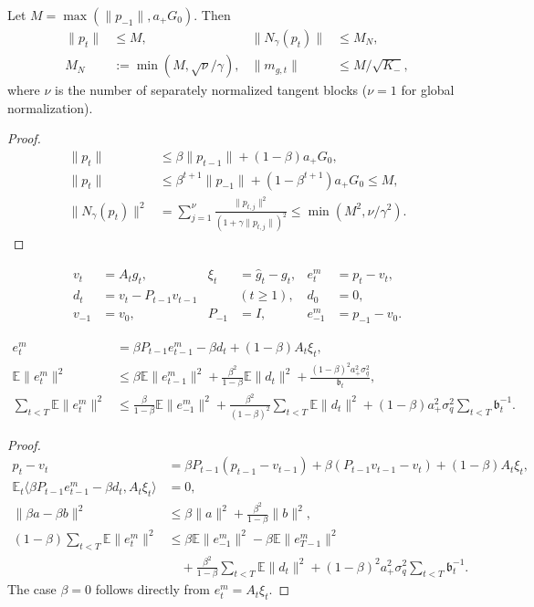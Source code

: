 \begin{lemma}
\label{lem:rigid-momentum-bound}
Let $M=\max(\|p_{-1}\|,a_+G_0)$. Then
\begin{align}
 \|p_t\|&\le M,&\|N_\gamma(p_t)\|&\le M_N,\\
 M_N&:=\min(M,\sqrt\nu/\gamma),&
 \|m_{g,t}\|&\le M/\sqrt{K_-},
\end{align}
where $\nu$ is the number of separately normalized tangent blocks ($\nu=1$ for global normalization).
\end{lemma}
\begin{proof}
\begin{align}
 \|p_t\|&\le\beta\|p_{t-1}\|+(1-\beta)a_+G_0,\\
 \|p_t\|&\le\beta^{t+1}\|p_{-1}\|+(1-\beta^{t+1})a_+G_0\le M,\\
 \|N_\gamma(p_t)\|^2
 &=\sum_{j=1}^{\nu}\frac{\|p_{t,j}\|^2}{(1+\gamma\|p_{t,j}\|)^2}
 \le\min(M^2,\nu/\gamma^2).
\end{align}
\end{proof}

\begin{definition}
\begin{align}
 v_t&=A_tg_t,&\xi_t&=\widehat g_t-g_t,&e_{t}^{m}&=p_t-v_t,\\
 d_t&=v_t-P_{t-1}v_{t-1}&& (t\ge1),&d_0&=0,\\
 v_{-1}&=v_0,&P_{-1}&=I,&e_{-1}^{m}&=p_{-1}-v_0.
\end{align}
\end{definition}
\begin{lemma}
\label{lem:tracking-new}
\begin{align}\label{eq:tracking-identity}
 e_{t}^{m}&=\beta P_{t-1}e_{t-1}^{m}-\beta d_t+(1-\beta)A_t\xi_t,\\
 \mathbb E\|e_{t}^{m}\|^2
 &\le\beta\mathbb E\|e_{t-1}^{m}\|^2+
 \frac{\beta^2}{1-\beta}\mathbb E\|d_t\|^2+
 \frac{(1-\beta)^2a_+^2\sigma_q^2}{\mathfrak b_t},\\
 \sum_{t<T}\mathbb E\|e_{t}^{m}\|^2
 &\le\frac{\beta}{1-\beta}\mathbb E\|e_{-1}^{m}\|^2+
 \frac{\beta^2}{(1-\beta)^2}\sum_{t<T}\mathbb E\|d_t\|^2
 +(1-\beta)a_+^2\sigma_q^2\sum_{t<T}\mathfrak b_t^{-1}.
 \label{eq:tracking-sum}
\end{align}
\end{lemma}
\begin{proof}
\begin{align}
 p_t-v_t
 &=\beta P_{t-1}(p_{t-1}-v_{t-1})
 +\beta(P_{t-1}v_{t-1}-v_t)+(1-\beta)A_t\xi_t,\\
 \mathbb E_t\langle\beta P_{t-1}e_{t-1}^{m}-\beta d_t,A_t\xi_t\rangle&=0,\\
 \|\beta a-\beta b\|^2
 &\le\beta\|a\|^2+\frac{\beta^2}{1-\beta}\|b\|^2,\\
 (1-\beta)\sum_{t<T}\mathbb E\|e_{t}^{m}\|^2
 &\le\beta\mathbb E\|e_{-1}^{m}\|^2-
 \beta\mathbb E\|e_{T-1}^{m}\|^2\\
 &\quad+\frac{\beta^2}{1-\beta}\sum_{t<T}\mathbb E\|d_t\|^2+
 (1-\beta)^2a_+^2\sigma_q^2\sum_{t<T}\mathfrak b_t^{-1}.
\end{align}
The case $\beta=0$ follows directly from $e_{t}^{m}=A_t\xi_t$.
\end{proof}

